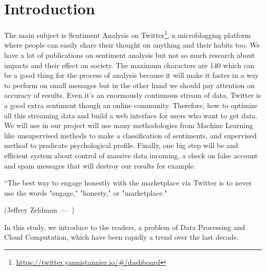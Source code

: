 \documentclass{acmtog} %
\let\oldquote\quote
\let\endoldquote\endquote
\renewenvironment{quote}[2][]
  {\if\relax\detokenize{#1}\relax
     \def\quoteauthor{#2}%
   \else
     \def\quoteauthor{#2~---~#1}%
   \fi
   \oldquote}
  {\par\nobreak\smallskip\hfill(\quoteauthor)%
   \endoldquote\addvspace{\bigskipamount}}
\begin{document}
\section{Introduction}

The main subject is Sentiment Analysis on Twitter\footnote{\url{https://twitter.yannistannier.io/#/dashboard}}, a microblogging platform where people can easily share their thought on anything and their habits too. We have a lot of publications on sentiment analysis but not so much research about impacts and their effect on society. The maximum characters are 140 which can be a good thing for the process of analysis because it will make it faster in a way to perform on small messages but in the other hand we should pay attention on accuracy of results. Even it’s an enormously continuous stream of data, Twitter is a good extra sentiment though an online community. Therefore, how to optimize all this streaming data and build a web interface for users who want to get data. We will use in our project will use many methodologies from Machine Learning like unsupervised methods to make a classification of sentiments, and supervised method to predicate psychological profile. Finally, one big  step will be and efficient system about control of massive data incoming, a check on false account and spam messages that will destroy our results for example.
 
\begin{quote}{Jeffrey Zeldman}
“The best way to engage honestly with the marketplace via Twitter is to never use the words "engage," "honesty," or "marketplace." 
\end{quote}

In this study, we introduce to the readers, a problem of Data Processing and Cloud Computation, which have been rapidly a trend over the last decade. 
\end{document}
